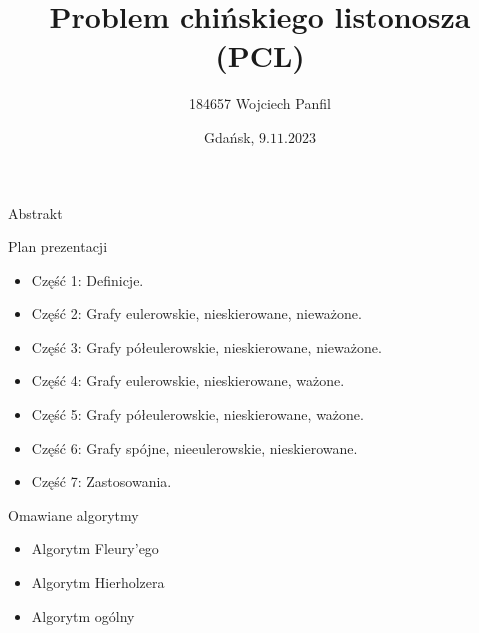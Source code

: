 \documentclass[polish,envcountsect,10pt]{beamer}
\title{Problem chińskiego listonosza (PCL)}
\author{184657 Wojciech Panfil}
\date{Gdańsk, \texorpdfstring{$9.11.2023$}{9.11.2023}}
\begin{document}
\frame{\titlepage}

\begin{frame}{Abstrakt}
    \begin{block}{Plan prezentacji}
        \begin{itemize}
            \item Część 1: Definicje.
            \item Część 2: Grafy eulerowskie, nieskierowane, nieważone.
            \item Część 3: Grafy półeulerowskie, nieskierowane, nieważone.
            \item Część 4: Grafy eulerowskie, nieskierowane, ważone.
            \item Część 5: Grafy półeulerowskie, nieskierowane, ważone.
            \item Część 6: Grafy spójne, nieeulerowskie, nieskierowane.
            \item Część 7: Zastosowania.
        \end{itemize}
    \end{block}
    \begin{block}{Omawiane algorytmy}
        \begin{itemize}
            \item Algorytm Fleury'ego
            \item Algorytm Hierholzera
            \item Algorytm ogólny
        \end{itemize}
    \end{block}
\end{frame}
\end{document}
